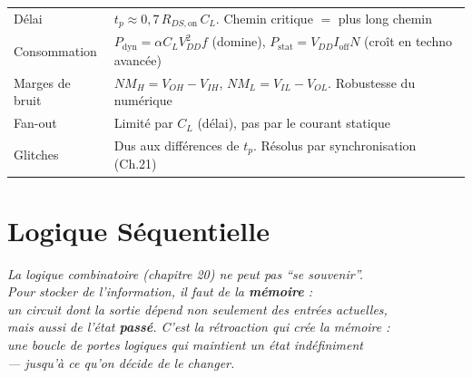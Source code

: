 \documentclass[12pt,a4paper,twoside]{book}
\begin{document}
\begin{ingenieur}[title={\color{white} Résumé --- Niveau Ingénieur}]
\begin{center}
\renewcommand{\arraystretch}{1.3}
\begin{tabular}{p{3.5cm}p{9.5cm}}
\toprule
Délai & $t_p \approx 0{,}7\,R_{DS,\text{on}}\,C_L$. Chemin critique $=$ plus long chemin \\
Consommation & $P_{\text{dyn}} = \alpha C_L V_{DD}^2 f$ (domine), $P_{\text{stat}} = V_{DD} I_{\text{off}} N$ (croît en techno avancée) \\
Marges de bruit & $NM_H = V_{OH}-V_{IH}$, $NM_L = V_{IL}-V_{OL}$. Robustesse du numérique \\
Fan-out & Limité par $C_L$ (délai), pas par le courant statique \\
Glitches & Dus aux différences de $t_p$. Résolus par synchronisation (Ch.21) \\
\bottomrule
\end{tabular}
\end{center}
\end{ingenieur}


\chapter{Logique Séquentielle}

\begin{center}
\textit{La logique combinatoire (chapitre 20) ne peut pas ``se souvenir''.\\
Pour stocker de l'information, il faut de la \textbf{mémoire} :\\
un circuit dont la sortie dépend non seulement des entrées actuelles,\\
mais aussi de l'état \textbf{passé}. C'est la rétroaction qui crée la mémoire :\\
une boucle de portes logiques qui maintient un état indéfiniment\\
--- jusqu'à ce qu'on décide de le changer.}
\end{center}
\end{document}
